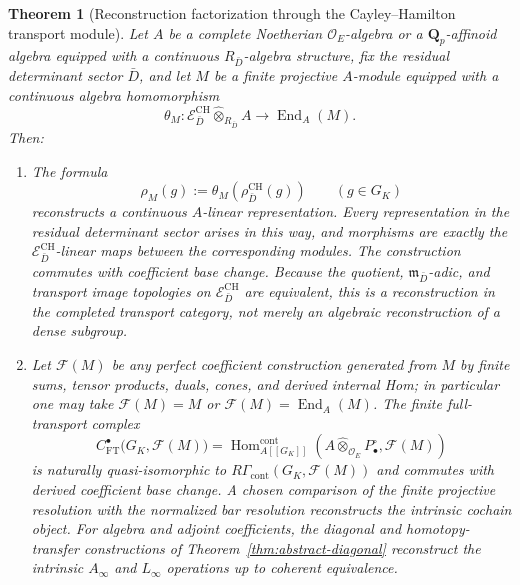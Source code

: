 \documentclass[11pt]{article}
\newtheorem{theorem}{Theorem}[section]
\theoremstyle{definition}
\newcommand{\Qp}{\mathbf Q_p}
\begin{document}
\begin{theorem}[Reconstruction factorization through the Cayley--Hamilton transport module]\label{thm:reconstruction-factorization}
Let $A$ be a complete Noetherian $\mathcal O_E$-algebra or a $\Qp$-affinoid
algebra equipped with a continuous $R_{\bar D}$-algebra structure, fix the
residual determinant sector $\bar D$, and let $M$ be a finite
projective $A$-module equipped with a continuous algebra homomorphism
\begin{equation}\label{eq:ch-module-action-reconstruction}
 \theta_M:
 \mathcal E^{\mathrm{CH}}_{\bar D}
 \widehat\otimes_{R_{\bar D}}A
 \longrightarrow \operatorname{End}_A(M).
\end{equation}
Then:

\begin{enumerate}[label=\textnormal{(\roman*)}]
\item The formula
\begin{equation}\label{eq:ch-transport-reconstruction}
 \rho_M(g):=\theta_M\!\left(\rho^{\mathrm{CH}}_{\bar D}(g)\right)
 \qquad(g\in G_K)
\end{equation}
reconstructs a continuous $A$-linear representation.  Every representation
in the residual determinant sector arises in this way, and morphisms are
exactly the $\mathcal E^{\mathrm{CH}}_{\bar D}$-linear maps between the
corresponding modules.  The construction commutes with coefficient base
change.  Because the quotient, $\mathfrak m_{\bar D}$-adic, and transport
image topologies on $\mathcal E^{\mathrm{CH}}_{\bar D}$ are equivalent, this
is a reconstruction in the completed transport category, not merely an
algebraic reconstruction of a dense subgroup.

\item Let $\mathcal F(M)$ be any perfect coefficient construction generated
from $M$ by finite sums, tensor products, duals, cones, and derived internal
Hom; in particular one may take $\mathcal F(M)=M$ or
$\mathcal F(M)=\operatorname{End}_A(M)$.  The finite full-transport complex
\begin{equation}\label{eq:reconstruction-ft-cochain}
 C_{\mathrm{FT}}^\bullet\bigl(G_K,\mathcal F(M)\bigr)
 =\operatorname{Hom}^{\mathrm{cont}}_{A[[G_K]]}
 \left(A\widehat\otimes_{\mathcal O_E}P_\bullet^\circ,
       \mathcal F(M)\right)
\end{equation}
is naturally quasi-isomorphic to
$R\Gamma_{\mathrm{cont}}(G_K,\mathcal F(M))$ and commutes with derived
coefficient base change.  A chosen comparison of the finite projective
resolution with the normalized bar resolution reconstructs the intrinsic
cochain object.  For algebra and adjoint coefficients, the diagonal and
homotopy-transfer constructions of Theorem~\ref{thm:abstract-diagonal}
reconstruct the intrinsic $A_\infty$ and $L_\infty$ operations up to coherent
equivalence.


\end{enumerate}
\end{theorem}
\end{document}
